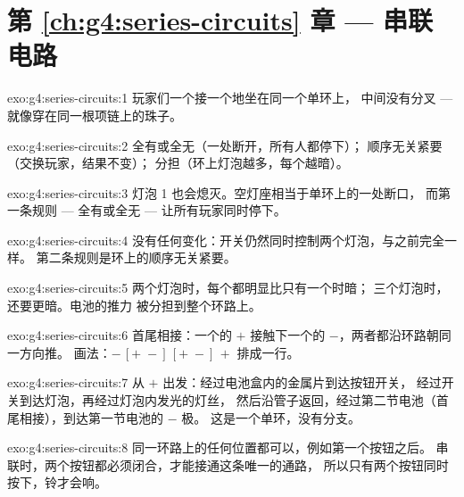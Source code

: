 \section*{第 \ref{ch:g4:series-circuits} 章 --- 串联电路}

\begin{solution}{exo:g4:series-circuits:1}
玩家们一个接一个地坐在同一个单环上，
中间没有分叉 --- 就像穿在同一根项链上的珠子。
\end{solution}

\begin{solution}{exo:g4:series-circuits:2}
全有或全无（一处断开，所有人都停下）；
顺序无关紧要（交换玩家，结果不变）；
分担（环上灯泡越多，每个越暗）。
\end{solution}

\begin{solution}{exo:g4:series-circuits:3}
灯泡 1 也会熄灭。空灯座相当于单环上的一处断口，
而第一条规则 --- 全有或全无 --- 让所有玩家同时停下。
\end{solution}

\begin{solution}{exo:g4:series-circuits:4}
没有任何变化：开关仍然同时控制两个灯泡，与之前完全一样。
第二条规则是环上的顺序无关紧要。
\end{solution}

\begin{solution}{exo:g4:series-circuits:5}
两个灯泡时，每个都明显比只有一个时暗；
三个灯泡时，还要更暗。电池的推力
被分担到整个环路上。
\end{solution}

\begin{solution}{exo:g4:series-circuits:6}
首尾相接：一个的 $+$ 接触下一个的 $-$，两者都沿环路朝同一方向推。
画法：$-\,[{+}\;{-}]\,[{+}\;
{-}]\,+$ 排成一行。
\end{solution}

\begin{solution}{exo:g4:series-circuits:7}
从 $+$ 出发：经过电池盒内的金属片到达按钮开关，
经过开关到达灯泡，再经过灯泡内发光的灯丝，
然后沿管子返回，经过第二节电池（首尾相接），到达第一节电池的 $-$ 极。
这是一个单环，没有分支。
\end{solution}

\begin{solution}{exo:g4:series-circuits:8}
同一环路上的任何位置都可以，例如第一个按钮之后。
串联时，两个按钮都必须闭合，才能接通这条唯一的通路，
所以只有两个按钮同时按下，铃才会响。
\end{solution}

